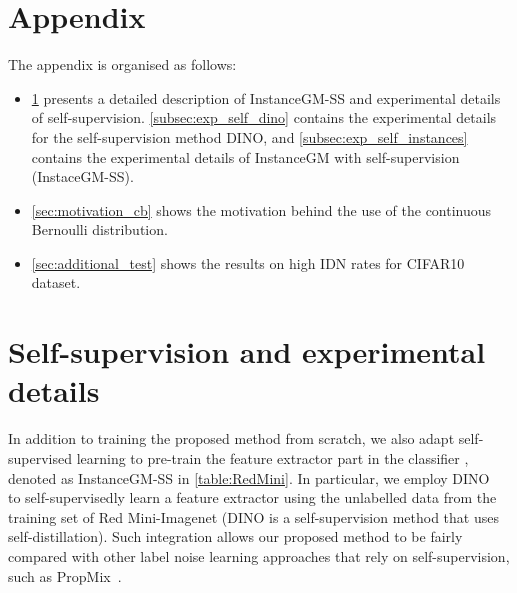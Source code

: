 \documentclass[10pt,twocolumn,letterpaper]{article}
\begin{document}
    
    {\small
    
    
    }
    
    \onecolumn
\appendix
\section*{Appendix}
The appendix is organised as follows:
\begin{itemize}
\item \cref{sec:self_supervision} presents a detailed description of InstanceGM-SS and experimental details of self-supervision. \cref{subsec:exp_self_dino} contains the experimental details for the self-supervision method DINO, and \cref{subsec:exp_self_instances} contains the experimental details of InstanceGM with self-supervision (InstaceGM-SS).
    \item \cref{sec:motivation_cb} shows the motivation behind the use of the continuous Bernoulli distribution.
\item \cref{sec:additional_test} shows the results on high IDN rates for CIFAR10 dataset. 


\end{itemize}









\section{Self-supervision and experimental details}\label{sec:self_supervision}


    In addition to training the proposed method from scratch, we also adapt self-supervised learning to pre-train the feature extractor part in the classifier , denoted as InstanceGM-SS in \cref{table:RedMini}. In particular, we employ DINO~\cite{caron2021emerging} to self-supervisedly learn a feature extractor using the unlabelled data from the training set of Red Mini-Imagenet (DINO is a self-supervision method that uses self-distillation). Such integration allows our proposed method to be fairly compared with other label noise learning approaches that rely on self-supervision, such as PropMix~\cite{cordeiro2021propmix}.
\end{document}
